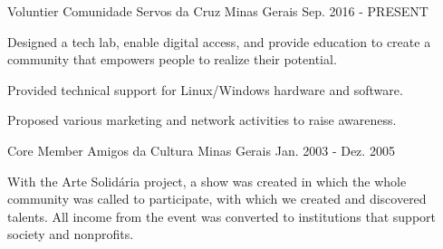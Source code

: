 

\begin{cventries}
  \cventry
    {Voluntier} %
    {Comunidade Servos da Cruz} %
    {Minas Gerais} %
    {Sep. 2016 - PRESENT} %
    {
      \begin{cvitems} %
      	\item {Designed a tech lab, enable digital access, and provide education to create a community that empowers people to realize their potential.}
        \item {Provided technical support for Linux/Windows hardware and software.}
        \item {Proposed various marketing and network activities to raise awareness.}
      \end{cvitems}
    }
  \cventry
    {Core Member} %
    {Amigos da Cultura} %
    {Minas Gerais} %
    {Jan. 2003 - Dez. 2005} %
    {
      \begin{cvitems} %
        \item {With the Arte Solidária project, a show was created in which the whole community was called to participate, with which we created and discovered talents. All income from the event was converted to institutions that support society and nonprofits.}
      \end{cvitems}
    }



  
\end{cventries}
